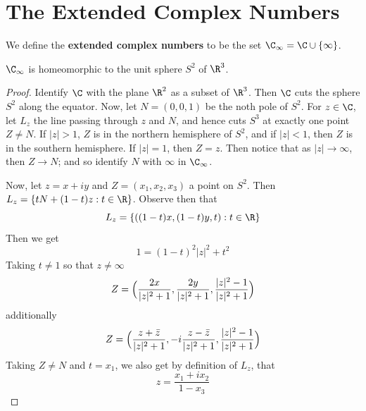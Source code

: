 \section{The Extended Complex Numbers}

\begin{definition}
    We define the \textbf{extended complex numbers} to be the set $\C_\infty=\C
    \cup \{\infty\}$.
\end{definition}

\begin{lemma}\label{1.3.1}
    $\C_\infty$ is homeomorphic to the unit sphere $S^2$ of $\R^3$.
\end{lemma}
\begin{proof}
    Identify $\C$ with the plane $\R^2$ as a subset of $\R^3$. Then  $\C$ cuts
    the sphere  $S^2$ along the equator. Now, let  $N=(0,0,1)$ be the noth pole
    of $S^2$. For  $z \in \C$, let  $L_z$ the line passing through $z$ and $N$,
    and hence cuts  $S^3$ at exactly one point  $Z \neq N$. If  $|z|>1$,  $Z$
    is in the northern hemisphere of  $S^2$, and if  $|z|<1$, then  $Z$ is in
    the southern hemisphere. If  $|z|=1$, then  $Z=z$. Then notice that as
    $|z| \xrightarrow{} \infty$, then $Z \xrightarrow{} N$; and so identify
    $N$ with  $\infty$ in  $\C_\infty$.

    Now, let  $z=x+iy$ and  $Z=(x_1,x_2,x_3)$ a point on $S^2$. Then
    $L_z=\{tN+(1-t)z : t \in \R\}$. Observe then that
    \begin{equation*}
        L_z=\{((1-t)x,(1-t)y,t) : t \in \R\}
    \end{equation*}
    Then we get
    \begin{equation*}
        1=(1-t)^2|z|^2+t^2
    \end{equation*}
    Taking $t \neq 1$ so that  $z \neq \infty$
    \begin{equation*}
        Z=\Big{(}\frac{2x}{|z|^2+1},\frac{2y}{|z|^2+1},
        \frac{|z|^2-1}{|z|^2+1}\Big{)}
    \end{equation*}
    additionally
    \begin{equation*}
        Z=\Big{(}\frac{z+\bar{z}}{|z|^2+1},-i\frac{z-\bar{z}}{|z|^2+1},
        \frac{|z|^2-1}{|z|^2+1}\Big{)}
    \end{equation*}
    Taking $Z \neq N$ and  $t=x_1$, we also get by definition of $L_z$, that
    \begin{equation*}
        z=\frac{x_1+ix_2}{1-x_3}
    \end{equation*}


\end{proof}
